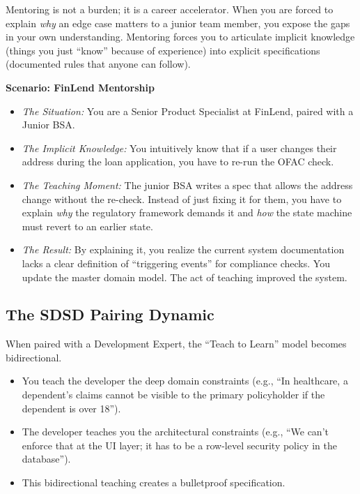\documentclass[
  11pt,
  openany,
  oneside]{book}
\providecommand{\tightlist}{%
  \setlength{\itemsep}{0pt}\setlength{\parskip}{0pt}}
\begin{document}
Mentoring is not a burden; it is a career accelerator. When you are
forced to explain \emph{why} an edge case matters to a junior team
member, you expose the gaps in your own understanding. Mentoring forces
you to articulate implicit knowledge (things you just ``know'' because
of experience) into explicit specifications (documented rules that
anyone can follow).

\textbf{Scenario: FinLend Mentorship}

\begin{itemize}
\tightlist
\item
  \emph{The Situation:} You are a Senior Product Specialist at FinLend,
  paired with a Junior BSA.
\item
  \emph{The Implicit Knowledge:} You intuitively know that if a user
  changes their address during the loan application, you have to re-run
  the OFAC check.
\item
  \emph{The Teaching Moment:} The junior BSA writes a spec that allows
  the address change without the re-check. Instead of just fixing it for
  them, you have to explain \emph{why} the regulatory framework demands
  it and \emph{how} the state machine must revert to an earlier state.
\item
  \emph{The Result:} By explaining it, you realize the current system
  documentation lacks a clear definition of ``triggering events'' for
  compliance checks. You update the master domain model. The act of
  teaching improved the system.
\end{itemize}

\subsection{The SDSD Pairing Dynamic}\label{the-sdsd-pairing-dynamic}

When paired with a Development Expert, the ``Teach to Learn'' model
becomes bidirectional.

\begin{itemize}
\tightlist
\item
  You teach the developer the deep domain constraints (e.g., ``In
  healthcare, a dependent's claims cannot be visible to the primary
  policyholder if the dependent is over 18'').
\item
  The developer teaches you the architectural constraints (e.g., ``We
  can't enforce that at the UI layer; it has to be a row-level security
  policy in the database'').
\item
  This bidirectional teaching creates a bulletproof specification.
\end{itemize}
\end{document}
